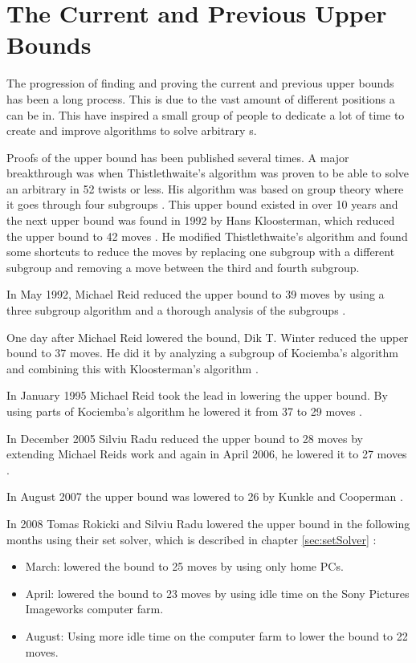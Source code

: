 \section{The Current and Previous Upper Bounds}
The progression of finding and proving the current and previous upper bounds has been a long process. This is due to the vast amount of different positions a \rubik{} can be in. This have inspired a small group of people to dedicate a lot of time to create and improve algorithms to solve arbitrary \rubik{}s.%



Proofs of the upper bound has been published several times. 
A major breakthrough was when Thistlethwaite's algorithm was proven to be able to solve an arbitrary \rubik{} in 52 twists or less. His algorithm was based on group theory where it goes through four subgroups \cite{jaapthistle}.
This upper bound existed in over 10 years and the next upper bound was found in 1992 by Hans Kloosterman, which reduced the upper bound to 42 moves \cite[p. 44]{rokickipdf}. 
He modified Thistlethwaite's algorithm and found some shortcuts to reduce the moves by replacing one subgroup with a different subgroup and removing a move between the third and fourth subgroup.

In May 1992, Michael Reid reduced the upper bound to 39 moves by using a three subgroup algorithm and a thorough analysis of the subgroups \cite[p. 52]{rokickipdf}.

One day after Michael Reid lowered the bound, Dik T. Winter reduced the upper bound to 37 moves. He did it by analyzing a subgroup of Kociemba's algorithm and combining this with Kloosterman's algorithm \cite[p. 53]{rokickipdf}.

In January 1995 Michael Reid took the lead in lowering the upper bound. By using parts of Kociemba's algorithm he lowered it from 37 to 29 moves \cite[p. 55]{rokickipdf}.

In December 2005 Silviu Radu reduced the upper bound to 28 moves by extending Michael Reids work and again in April 2006, he lowered it to 27 moves \cite[p. 58]{rokickipdf}.

In August 2007 the upper bound was lowered to 26 by Kunkle and Cooperman \cite[p. 63]{rokickipdf}.

In 2008 Tomas Rokicki and Silviu Radu lowered the upper bound in the following months using their set solver, which is described in chapter \ref{sec:setSolver} \cite[p. 66]{rokickipdf}:
\begin{itemize}
\item March: lowered the bound to 25 moves by using only home PCs.
\item April: lowered the bound to 23 moves by using idle time on the Sony Pictures Imageworks computer farm.
\item August: Using more idle time on the computer farm to lower the bound to 22 moves.
\end{itemize}

